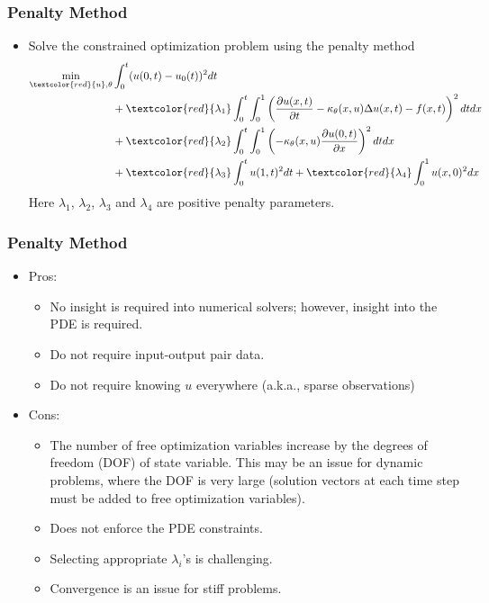 \documentclass{beamer}
\begin{document}
\begin{frame}
	\frametitle{Penalty Method}
	
	\begin{itemize}
		\item Solve the constrained optimization problem using the penalty method
		\begin{align*}
\min_{\textcolor{red}{u},\theta} &  \int_{0}^t ( u(0, t)- u_0(t))^2 dt \\
& + \textcolor{red}{\lambda_1} \int_{0}^t \int_{0}^1 \left(\frac{\partial u(x, t)}{\partial t} - {\kappa_\theta(x, u)}\Delta u(x, t) - f(x, t)\right)^2 dtdx\\
&	+  \textcolor{red}{\lambda_2}\int_0^t \int_0^1	\left(-{\kappa_\theta(x, u)}\frac{\partial u(0,t)}{\partial x}\right)^2 dtdx \\
& +  \textcolor{red}{\lambda_3}\int_0^t u(1, t)^2 dt+   \textcolor{red}{\lambda_4}\int_0^1 u(x, 0)^2 dx
		\end{align*}
	Here $\lambda_1$, $\lambda_2$, $\lambda_3$ and $\lambda_4$ are positive penalty parameters. 

	\end{itemize}
\end{frame}


\begin{frame}
	\frametitle{Penalty Method}
	\begin{itemize}
		\item Pros:
		\begin{itemize}
		\item No insight is required into numerical solvers; however, insight into the PDE is required. 
		\item Do not require input-output pair data. 
		\item Do not require knowing $u$ everywhere (a.k.a., sparse observations)
		\end{itemize}
		\item Cons:
		\begin{itemize}
		\item The number of free optimization variables increase by the degrees of freedom (DOF) of state variable. This may be an issue for dynamic problems, where the DOF is very large (solution vectors at each time step must be added to free optimization variables). 
		\item Does not enforce the PDE constraints.
		\item Selecting appropriate $\lambda_i$'s is challenging. 
		\item Convergence is an issue for stiff problems. 
		\end{itemize}
		
	\end{itemize}
\end{frame}
\end{document}

